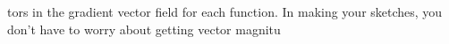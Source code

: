 \begin{activity}
tors
  in the gradient vector field for each function. In making your
  sketches, you don't have to worry about getting vector magnitu
\end{activity}
